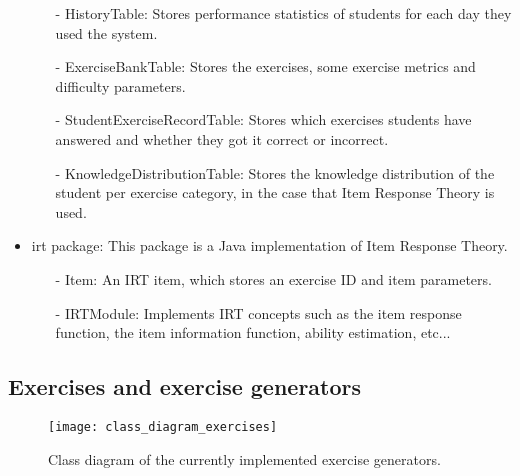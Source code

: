 \begin{itemize}
\begin{itemize}
      \item[-] \textsf{HistoryTable}: Stores performance statistics of students for each day they used the system.
      \item[-] \textsf{ExerciseBankTable}: Stores the exercises, some exercise metrics and difficulty parameters.
      \item[-] \textsf{StudentExerciseRecordTable}: Stores which exercises students have answered and whether they got it correct or incorrect.
      \item[-] \textsf{KnowledgeDistributionTable}: Stores the knowledge distribution of the student per exercise category, in the case that Item Response Theory is used.
      \end{itemize}
\item \textsf{irt} package: This package is a Java implementation of Item Response Theory.
      \begin{itemize}
      \item[-] \textsf{Item}: An IRT item, which stores an exercise ID and item parameters.
      \item[-] \textsf{IRTModule}: Implements IRT concepts such as the item response function, the item information function, ability estimation, etc...
      \end{itemize}
\end{itemize}

\subsection{Exercises and exercise generators}
\label{subsec:exercises-and-exercise-generators}
\begin{figure}[H]
\centering
\texttt{[image: class\_diagram\_exercises]}
\caption{Class diagram of the currently implemented exercise generators.}
\label{fig:class_diagram_exercises}
\end{figure}

